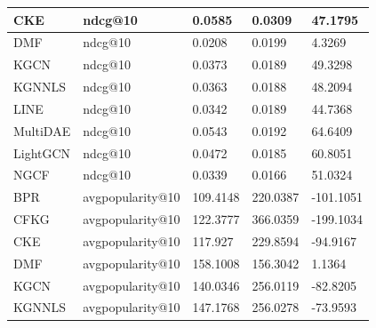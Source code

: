 \begin{table}[H]
\begin{tabular}{|l|l|l|l|l|}
    CKE              & ndcg@10           & 0.0585                        & 0.0309                          & 47.1795                               \\ \hline
    DMF              & ndcg@10           & 0.0208                        & 0.0199                          & 4.3269                                \\ \hline
    KGCN             & ndcg@10           & 0.0373                        & 0.0189                          & 49.3298                               \\ \hline
    KGNNLS           & ndcg@10           & 0.0363                        & 0.0188                          & 48.2094                               \\ \hline
    LINE             & ndcg@10           & 0.0342                        & 0.0189                          & 44.7368                               \\ \hline
    MultiDAE         & ndcg@10           & 0.0543                        & 0.0192                          & 64.6409                               \\ \hline
    LightGCN         & ndcg@10           & 0.0472                        & 0.0185                          & 60.8051                               \\ \hline
    NGCF             & ndcg@10           & 0.0339                        & 0.0166                          & 51.0324                               \\ \hline
    BPR              & avgpopularity@10 & 109.4148                      & 220.0387                        & -101.1051                             \\ \hline
    CFKG             & avgpopularity@10 & 122.3777                      & 366.0359                        & -199.1034                             \\ \hline
    CKE              & avgpopularity@10 & 117.927                       & 229.8594                        & -94.9167                              \\ \hline
    DMF              & avgpopularity@10 & 158.1008                      & 156.3042                        & 1.1364                                \\ \hline
    KGCN             & avgpopularity@10 & 140.0346                      & 256.0119                        & -82.8205                              \\ \hline
    KGNNLS           & avgpopularity@10 & 147.1768                      & 256.0278                        & -73.9593                              \\ \hline

\end{tabular}
\end{table}
